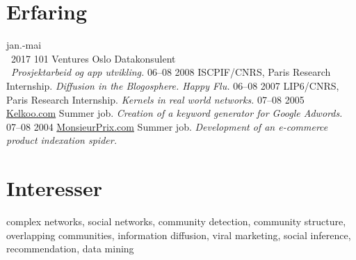 \documentclass[]{friggeri-cv}
\begin{document}
\section{Erfaring}

\begin{entrylist}
  \entry
    {\hfill jan.-mai \\\ \hfill 2017}
    {101 Ventures}
    {Oslo}
    {Datakonsulent \\\ \emph{Prosjektarbeid og app utvikling.}}
  \entry
    {06–08 2008}
    {ISCPIF/CNRS, Paris}
    {Research Internship.}
    {\emph{Diffusion in the Blogosphere. Happy Flu.}}
  \entry
    {06–08 2007}
    {LIP6/CNRS, Paris}
    {Research Internship.}
    {\emph{Kernels in real world networks.}}
  \entry
    {07–08 2005}
    {\href{http://www.kelkoo.com}{Kelkoo.com}}
    {Summer job.}
    {\emph{Creation of a keyword generator for Google Adwords.}}
  \entry
    {07–08 2004}
    {\href{http://www.monsieurprix.com}{MonsieurPrix.com}}
    {Summer job.}
    {\emph{Development of an e-commerce product indexation spider.}}
\end{entrylist}

\section{Interesser}

complex networks, social networks, community detection, community structure,
overlapping communities, information diffusion, viral marketing, social
inference, recommendation, data mining
\end{document}

